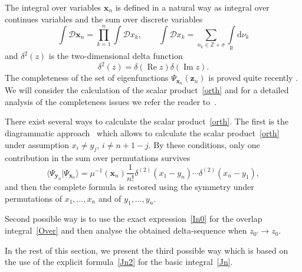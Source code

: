 \documentclass[pdftex]{sigma}
\renewcommand{\Re}{\operatorname{Re}}
\renewcommand{\Im}{\operatorname{Im}}
\numberwithin{equation}{section}
\begin{document}
The integral over variables $\bm{x}_n$ is defined in a natural way
as integral over continues variables and the sum over discrete variables
\begin{equation}\label{sumint}
	\int \mathcal{D}\bm{x}_n = \prod\limits_{k=1}^{n}\int\mathcal{D}x_k,\qquad 	\int\mathcal{D}x_k = \sum\limits_{n_k\in\mathbb{Z}+\sigma}\int\limits_{\mathbb{R}}\mathrm{d}\nu_k
\end{equation}
and $\delta^2(z)$ is the two-dimensional delta function
\begin{equation*}
	\delta^2(z) = \delta(\Re z) \delta(\Im z) .
\end{equation*}
The completeness of the set of eigenfunctions $\Psi_{\bm{x}_n}(\bm{z}_n)$ is proved quite recently \cite{M}. We will consider the calculation of the scalar product~\eqref{orth} and for a detailed analysis of the completeness issues we refer the reader to~\cite{M}.

There exist several ways to calculate the scalar product~\eqref{orth}.
The first is the diagrammatic approach~\cite{DM2} which allows to calculate
the scalar product~\eqref{orth} under assumption $x_i \neq y_j$, ${i\neq n+1-j}$.
By these conditions, only one contribution in the sum over permutations%
survives
\begin{equation*}
	\langle \Psi_{\bm{y}_n} | \Psi_{\bm{x}_n} \rangle =
	\mu^{-1}(\bm{x}_n) \frac{1}{n!} \delta^{(2)}(x_1-y_n) \cdots \delta^{(2)}(x_n-y_1),
\end{equation*}
and then the complete formula is restored using the symmetry under permutations of $x_1,\dots,x_n$ and of $y_1, \dots, y_n$.

Second possible way is to use the exact expression~\eqref{In0} for the overlap integral~\eqref{Over} and then analyse the obtained delta-sequence when $z_{0'} \to z_{0}$.

In the rest of this section, we present the third possible way which
is based on the use of the explicit formula~\eqref{Jn2} for the basic
integral~\eqref{Jn}.
\end{document}
